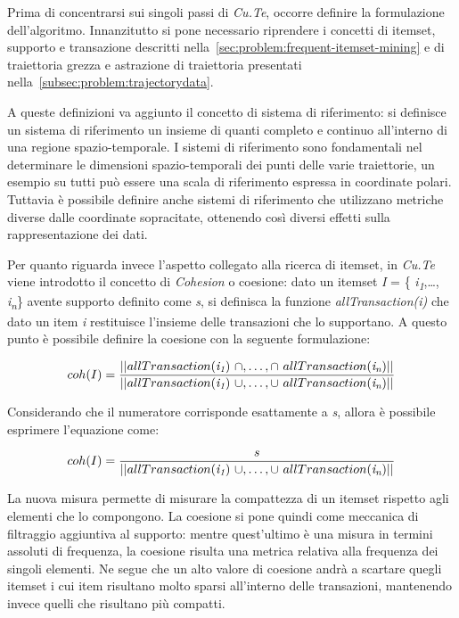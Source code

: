 Prima di concentrarsi sui singoli passi di \textit{Cu.Te}, occorre definire la formulazione dell'algoritmo.
Innanzitutto si pone necessario riprendere i concetti di itemset, supporto e transazione descritti nella~\cref{sec:problem:frequent-itemset-mining}
e di traiettoria grezza e astrazione di traiettoria presentati nella~\cref{subsec:problem:trajectorydata}.

A queste definizioni va aggiunto il concetto di sistema di riferimento: si definisce un sistema di riferimento un insieme di
quanti completo e continuo all'interno di una regione spazio-temporale.
I sistemi di riferimento sono fondamentali nel determinare le dimensioni spazio-temporali dei punti delle varie traiettorie,
un esempio su tutti può essere una scala di riferimento espressa in coordinate polari.
Tuttavia è possibile definire anche sistemi di riferimento che utilizzano metriche diverse dalle coordinate sopracitate,
ottenendo così diversi effetti sulla rappresentazione dei dati.

Per quanto riguarda invece l'aspetto collegato alla ricerca di itemset,
in \textit{Cu.Te} viene introdotto il concetto di \textit{Cohesion} o coesione: dato un itemset \textit{I} = \{ \textit{i\textsubscript{1}},\ldots, \textit{i\textsubscript{n}}\}
avente supporto definito come \textit{s}, si definisca la funzione \textit{allTransaction(i)} %
 che dato un item \textit{i} restituisce l'insieme delle
transazioni che lo supportano. A questo punto è possibile definire la coesione con la seguente formulazione:

\[ coh(I) = \frac{\lvert \lvert allTransaction(\textit{i\textsubscript{1}})~\cap ,\ldots, \cap~allTransaction(\textit{i\textsubscript{n}}) \rvert\rvert}{\lvert \lvert allTransaction(\textit{i\textsubscript{1}})~\cup ,\ldots, \cup~allTransaction(\textit{i\textsubscript{n}}) \rvert\rvert} \]

Considerando che il numeratore corrisponde esattamente a \textit{s}, allora è possibile esprimere l'equazione come:

\[ coh(I) = \frac{s}{\lvert \lvert allTransaction(\textit{i\textsubscript{1}})~\cup ,\ldots, \cup~allTransaction(\textit{i\textsubscript{n}}) \rvert\rvert} \]

La nuova misura permette di misurare la compattezza di un itemset rispetto agli elementi che lo compongono.
La coesione si pone quindi come meccanica di filtraggio aggiuntiva al supporto:
mentre quest'ultimo è una misura in termini assoluti di frequenza, la coesione risulta una metrica relativa alla frequenza dei singoli elementi.
Ne segue che un alto valore di coesione andrà a scartare quegli itemset i cui item risultano molto sparsi all'interno delle transazioni,
mantenendo invece quelli che risultano più compatti.


